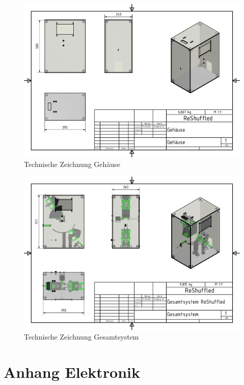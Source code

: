 \begin{figure}
    \centering
    \includegraphics[scale=0.85,page=1]{fig/mech/Gehaeuse.pdf}
    \caption{Technische Zeichnung Gehäuse}
\end{figure}

\begin{figure}
    \centering
    \includegraphics[scale=0.85,page=1]{fig/mech/Gesamtsystem.pdf}
    \caption{Technische Zeichnung Gesamtsystem}
\end{figure}

\chapter{Anhang Elektronik}

